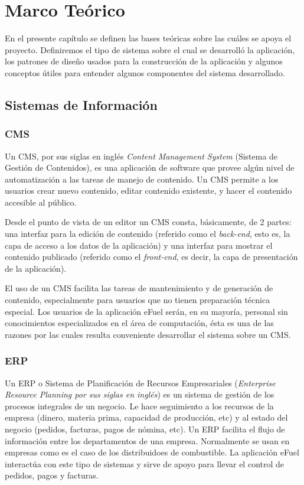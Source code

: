 \chapter{Marco Teórico}
En el presente capítulo se definen las bases teóricas sobre las cuáles se apoya el proyecto. Definiremos el tipo de sistema sobre el cual se desarrolló la aplicación, los patrones de diseño usados para la construcción de la aplicación y algunos conceptos útiles para entender algunos componentes del sistema desarrollado.

\section{Sistemas de Información}
    \subsection{CMS}
    Un CMS, por sus siglas en inglés \textit{Content Management System} (Sistema de Gestión de Contenidos), es una aplicación de software que provee algún nivel de automatización a las tareas de manejo de contenido. Un CMS permite a los usuarios crear nuevo contenido, editar contenido existente, y hacer el contenido accesible al público. \cite{cmsBarker}

    Desde el punto de vista de un editor un CMS consta, básicamente, de 2 partes: una interfaz para la edición de contenido (referido como el \textit{back-end}, esto es, la capa de acceso a los datos de la aplicación) y una interfaz para mostrar el contenido publicado (referido como el \textit{front-end}, es decir, la capa de presentación de la aplicación).

    El uso de un CMS facilita las tareas de mantenimiento y de generación de contenido, especialmente para usuarios que no tienen preparación técnica especial. Los usuarios de la aplicación eFuel serán, en su mayoría, personal sin conocimientos especializados en el área de computación, ésta es una de las razones por las cuales resulta conveniente desarrollar el sistema sobre un CMS.

    \subsection{ERP}
    Un ERP o Sistema de Planificación de Recursos Empresariales (\emph{Enterprise Resource Planning por sus siglas en inglés}) es un sistema de gestión de los procesos integrales de un negocio. Le hace seguimiento a los recursos de la empresa (dinero, materia prima, capacidad de producción, etc) y al estado del negocio (pedidos, facturas, pagos de nómina, etc). Un ERP facilita el flujo de información entre los departamentos de una empresa. Normalmente se usan en empresas como es el caso de los distribuidoes de combustible. La aplicación eFuel interactúa con este tipo de sistemas y sirve de apoyo para llevar el control de pedidos, pagos y facturas.

